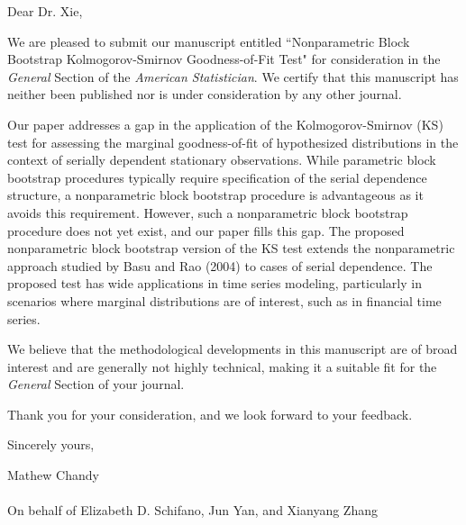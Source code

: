 \documentclass[12pt]{article}
\begin{document}

\bigskip

Dear Dr. Xie,

We are pleased to submit our manuscript entitled 
``Nonparametric Block Bootstrap Kolmogorov-Smirnov Goodness-of-Fit
Test"  for consideration in the \emph{General} Section of the
\textit{American Statistician}. We certify that this manuscript has
neither been published nor is under consideration by any other
journal.


Our paper addresses a gap in the application of the Kolmogorov-Smirnov
(KS) test for assessing the marginal goodness-of-fit of hypothesized
distributions in the context of serially dependent stationary
observations. While parametric block bootstrap procedures typically
require specification of the serial dependence structure, a
nonparametric block bootstrap procedure is advantageous as it avoids
this requirement. However, such a nonparametric block bootstrap procedure does 
not yet exist, and our paper fills this gap. The proposed nonparametric block 
bootstrap version of the KS test extends the nonparametric approach studied by 
Basu and Rao (2004) to cases of serial dependence.  The proposed test has wide
applications in time series modeling, particularly in scenarios where
marginal distributions are of interest, such as in financial time series.


We believe that the methodological developments in this manuscript are
of broad interest and are generally not highly technical, making it a
suitable fit for the \emph{General} Section of your journal.


Thank you for your consideration, and we look forward to your feedback.


\bigskip

Sincerely yours,

\vspace{2cm}

Mathew Chandy\\ \\On behalf of Elizabeth D. Schifano, Jun Yan, and 
Xianyang Zhang
\end{document}
